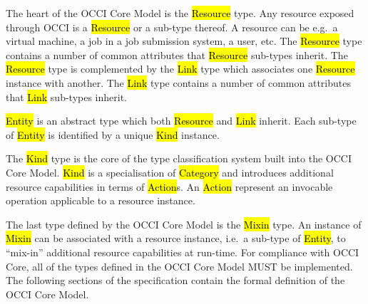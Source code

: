\documentclass[10pt,a4paper]{article}
\begin{document}
The heart of the OCCI Core Model is the \hl{Resource} type. Any resource exposed
through OCCI is a \hl{Resource} or a sub-type thereof.
A resource can be e.g.~a virtual machine, a job in a job submission system, a
user, etc.
%
The \hl{Resource} type contains a number of common attributes that
\hl{Resource} sub-types inherit. The \hl{Resource} type is
complemented by the \hl{Link} type which associates one \hl{Resource} instance
with another.
%
The \hl{Link} type contains a number of common attributes that
\hl{Link} sub-types inherit.

\hl{Entity} is an abstract type which both \hl{Resource} and \hl{Link} inherit.
Each sub-type of \hl{Entity} is identified by a unique \hl{Kind} instance.
%

The \hl{Kind} type is the core of the type classification
system built into the OCCI Core Model. \hl{Kind} is a specialisation of
\hl{Category} and introduces additional resource capabilities in terms of \hl{Action}s.
An \hl{Action} represent an invocable operation applicable to a resource
instance.

The last type defined by the OCCI Core Model is the \hl{Mixin} type. An instance of
\hl{Mixin} can be associated with a resource instance, i.e.~a sub-type of
\hl{Entity}, to ``mix-in'' additional resource capabilities at run-time.
%
For compliance with OCCI Core, all of the types defined in the OCCI Core Model MUST
be implemented.  The following sections of the specification contain the formal
definition of the OCCI Core Model.
\end{document}
